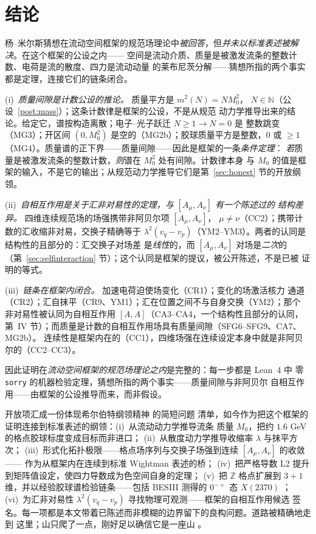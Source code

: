 \documentclass[aps,prd,preprint,superscriptaddress,amsmath,amssymb]{revtex4-2}
\begin{document}
\section{结论}
\label{sec:conclusion}

杨--米尔斯猜想在流动空间框架的规范场理论中\emph{被回答}，但\emph{并未以标准表述被解决}。在这个框架的公设之内——
空间是流动介质、质量是被激发流条的整数计数、电荷是流的散度、四力是流动动量
的莱布尼茨分解——猜想所指的两个事实都是定理，连接它们的链条闭合。

(i)~\emph{质量间隙是计数公设的推论。} 质量平方是 $m^2(N)=N M_0^2$，
$N\in\mathbb{N}$（公设~\ref{post:mass}）；这条计数律是框架的公设，不是从规范
动力学推导出来的结论。给定它，谱按构造离散；电子--光子跃迁 $N\ge1\to N=0$ 是
整数跳变（MG3）；开区间 $(0,M_0^2)$ 是空的（MG2b）；胶球质量平方是整数，$0$
或 $\ge1$（MG4）。质量谱的正下界——质量间隙——因此是框架的一条\emph{条件定理}：
\emph{若}质量是被激发流条的整数计数，\emph{则}谱在 $M_0^2$ 处有间隙。计数律本身
与 $M_0$ 的值是框架的输入，不是它的输出；从规范动力学推导它们是第~\ref{sec:honest}
节的开放纲领。

(ii)~\emph{自相互作用是关于汇非对易性的定理，与 $[A_\mu,A_\nu]$ 有一个陈述过的
结构差异。} 四维连续规范场的场强携带非阿贝尔项 $[A_\mu,A_\nu]$，
$\mu\neq\nu$（CC2）；携带计数的汇收缩非对易，交换子精确等于
$\lambda^2(v_q-v_p)$（YM2--YM3）。两者的认同是结构性的且部分的：汇交换子对场差
是\emph{线性}的，而 $[A_\mu,A_\nu]$ 对场是\emph{二次}的
（第~\ref{sec:selfinteraction} 节）；这个认同是框架的提议，被公开陈述，不是已被
证明的等式。

(iii)~\emph{链条在框架内闭合。} 加速电荷迫使场变化（CR1）；变化的场激活核力
通道（CR2）；汇自抹平（CR9、YM1）；汇在位置之间不与自身交换（YM2）；那个
非对易性被认同为自相互作用 $[A,A]$（CA3--CA4，一个结构性且部分的认同，
第~IV 节）；而质量是计数的自相互作用场具有质量间隙（SFG6--SFG9、CA7、MG2b）。
连续性是框架内在的（CC1），四维场强在连续设定本身中就是非阿贝尔的（CC2--CC3）。

因此证明在\emph{流动空间框架的规范场理论之内}是完整的：每一步都是 Lean~4 中
零 \texttt{sorry} 的机器检验定理，猜想所指的两个事实——质量间隙与非阿贝尔
自相互作用——由框架的公设推导而来，而非假设。

开放项汇成一份体现希尔伯特纲领精神 \cite{hilbert1900mathematische} 的简短问题
清单，如今作为把这个框架的证明连接到标准表述的纲领：(i)~从流动动力学推导流条
质量 $M_0$，把约 $1.6$ GeV 的格点胶球标度变成目标而非进口；
(ii)~从散度动力学推导收缩率 $\lambda$ 与抹平方次；
(iii)~形式化拓扑极限——格点场序列与交换子场强到连续 $[A_\mu,A_\nu]$ 的收敛——
作为从框架内在连续到标准 Wightman 表述的桥；
(iv)~把严格导数 L2 提升到矩阵值设定，使四力导数成为色空间自身的定理；
(v)~把 $\mathbb{Z}$ 格点扩展到 $3{+}1$ 维，并以经验胶球谱检验链条——包括
BESIII 测得的 $0^{-+}$ 态 $X(2370)$
\cite{morningstar1999glueball,chen2006glueball,besiii2026lightest}；
(vi)~为汇非对易性 $\lambda^2(v_q-v_p)$ 寻找物理可观测——框架的自相互作用候选
签名。每一项都是本文带着已陈述而非模糊的边界留下的良构问题。道路被精确地走到
这里；山只爬了一点，刚好足以确信它是一座山
\cite{hilbert1900mathematische,ProjectionPhysics}。
\end{document}
